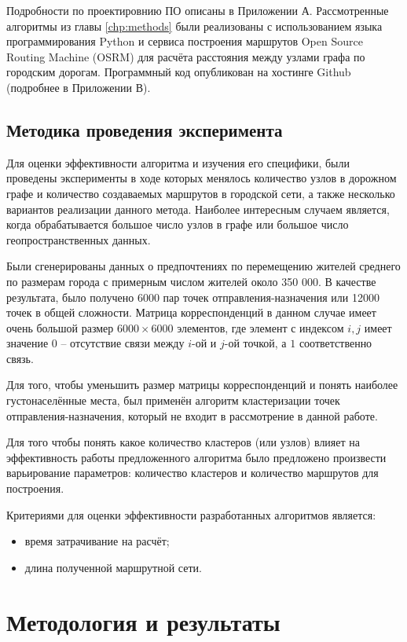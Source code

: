 Подробности по проектировнию ПО описаны в Приложении А. Рассмотренные алгоритмы из главы \ref{chp:methods} 
были реализованы с использованием языка программирования Python и сервиса построения маршрутов Open Source 
Routing Machine (OSRM) для расчёта расстояния между узлами графа по городским дорогам. Программный код 
опубликован на хостинге Github (подробнее в Приложении В).

\section{Методика проведения эксперимента}
Для оценки эффективности алгоритма и изучения его специфики, были проведены эксперименты в ходе которых 
менялось количество узлов в дорожном графе и количество создаваемых маршрутов в городской сети, а также 
несколько вариантов реализации данного метода. Наиболее интересным случаем является, когда обрабатывается 
большое число узлов в графе или большое число геопространственных данных.

Были сгенерированы данных о предпочтениях по перемещению жителей среднего по размерам города с примерным 
числом жителей около 350 000. В качестве результата, было получено 6000 пар точек отправления-назначения или 
12000 точек в общей сложности. Матрица корреспонденций в данном случае имеет очень большой размер 
\( 6000 \times 6000 \) элементов, где элемент с индексом \( i, j \) имеет значение \( 0 \) -- отсутствие связи 
между \( i \)-ой и \( j \)-ой точкой, а \( 1 \) соответственно связь.

Для того, чтобы уменьшить размер матрицы корреспонденций и понять наиболее густонаселённые места, был 
применён алгоритм кластеризации точек отправления-назначения, который не входит в рассмотрение в данной 
работе.

Для того чтобы понять какое количество кластеров (или узлов) влияет на эффективность работы предложенного 
алгоритма было предложено произвести варьирование параметров: количество кластеров и количество маршрутов для 
построения.

Критериями для оценки эффективности разработанных алгоритмов является:
\begin{itemize}
    \item время затрачивание на расчёт;
    \item длина полученной маршрутной сети.
\end{itemize}

\chapter{Методология и результаты}
